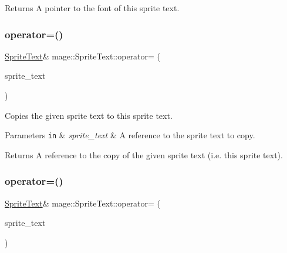 \begin{DoxyReturn}{Returns}
A pointer to the font of this sprite text. 
\end{DoxyReturn}
\hypertarget{classmage_1_1_sprite_text_af027a281c1fa600dd870ca04d91fcae8}{}\label{classmage_1_1_sprite_text_af027a281c1fa600dd870ca04d91fcae8} 
\subsubsection{\texorpdfstring{operator=()}{operator=()}\hspace{0.1cm}{\footnotesize\ttfamily [1/2]}}
{\footnotesize\ttfamily \hyperlink{classmage_1_1_sprite_text}{Sprite\+Text}\& mage\+::\+Sprite\+Text\+::operator= (\begin{DoxyParamCaption}\item[{const \hyperlink{classmage_1_1_sprite_text}{Sprite\+Text} \&}]{sprite\+\_\+text }\end{DoxyParamCaption})\hspace{0.3cm}{\ttfamily [delete]}}

Copies the given sprite text to this sprite text.


\begin{DoxyParams}[1]{Parameters}
\mbox{\tt in}  & {\em sprite\+\_\+text} & A reference to the sprite text to copy. \\
\hline
\end{DoxyParams}
\begin{DoxyReturn}{Returns}
A reference to the copy of the given sprite text (i.\+e. this sprite text). 
\end{DoxyReturn}
\hypertarget{classmage_1_1_sprite_text_a7e2e165d7682d9cc623b7c9725f76920}{}\label{classmage_1_1_sprite_text_a7e2e165d7682d9cc623b7c9725f76920} 
\subsubsection{\texorpdfstring{operator=()}{operator=()}\hspace{0.1cm}{\footnotesize\ttfamily [2/2]}}
{\footnotesize\ttfamily \hyperlink{classmage_1_1_sprite_text}{Sprite\+Text}\& mage\+::\+Sprite\+Text\+::operator= (\begin{DoxyParamCaption}\item[{\hyperlink{classmage_1_1_sprite_text}{Sprite\+Text} \&\&}]{sprite\+\_\+text }\end{DoxyParamCaption})\hspace{0.3cm}{\ttfamily [delete]}}

